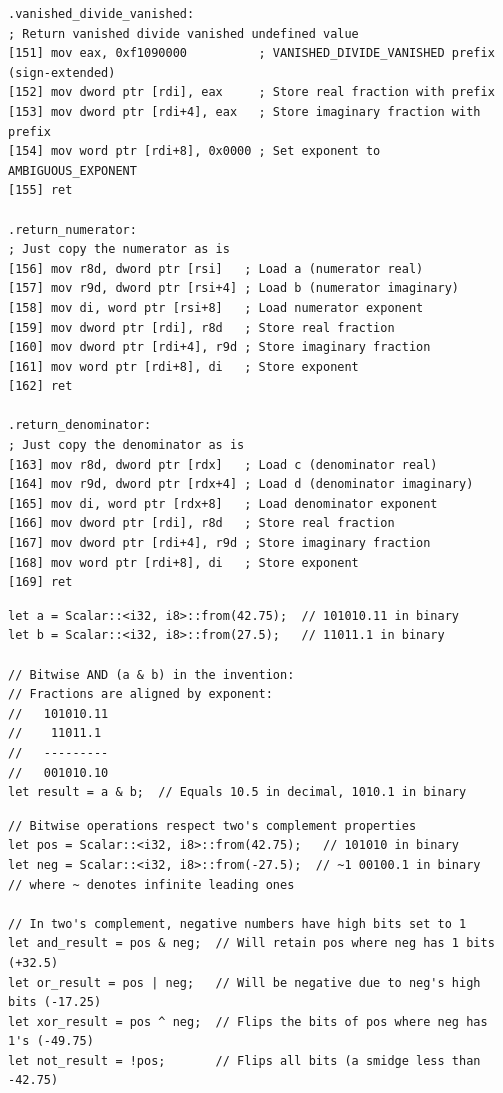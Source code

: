 \documentclass[12pt,letter]{article}
\begin{document}
\begin{lstlisting}[style=rust, caption={Complete Complex Division Assembly Implementation}, label={fig:circle_divide}]
.vanished_divide_vanished:
; Return vanished divide vanished undefined value
[151] mov eax, 0xf1090000          ; VANISHED_DIVIDE_VANISHED prefix (sign-extended)
[152] mov dword ptr [rdi], eax     ; Store real fraction with prefix
[153] mov dword ptr [rdi+4], eax   ; Store imaginary fraction with prefix
[154] mov word ptr [rdi+8], 0x0000 ; Set exponent to AMBIGUOUS_EXPONENT
[155] ret

.return_numerator:
; Just copy the numerator as is
[156] mov r8d, dword ptr [rsi]   ; Load a (numerator real)
[157] mov r9d, dword ptr [rsi+4] ; Load b (numerator imaginary)
[158] mov di, word ptr [rsi+8]   ; Load numerator exponent
[159] mov dword ptr [rdi], r8d   ; Store real fraction
[160] mov dword ptr [rdi+4], r9d ; Store imaginary fraction
[161] mov word ptr [rdi+8], di   ; Store exponent
[162] ret

.return_denominator:
; Just copy the denominator as is
[163] mov r8d, dword ptr [rdx]   ; Load c (denominator real)
[164] mov r9d, dword ptr [rdx+4] ; Load d (denominator imaginary)
[165] mov di, word ptr [rdx+8]   ; Load denominator exponent
[166] mov dword ptr [rdi], r8d   ; Store real fraction
[167] mov dword ptr [rdi+4], r9d ; Store imaginary fraction
[168] mov word ptr [rdi+8], di   ; Store exponent
[169] ret
\end{lstlisting}

\newpage
\begin{lstlisting}[style=rust, caption={Scalar Bitwise AND Example in Rust}, label={fig:scalar_bitwise_example}]
let a = Scalar::<i32, i8>::from(42.75);  // 101010.11 in binary
let b = Scalar::<i32, i8>::from(27.5);   // 11011.1 in binary

// Bitwise AND (a & b) in the invention:
// Fractions are aligned by exponent:
//   101010.11
//    11011.1
//   ---------
//   001010.10
let result = a & b;  // Equals 10.5 in decimal, 1010.1 in binary
\end{lstlisting}

\begin{lstlisting}[style=rust, caption={Scalar Bitwise Operations with Signs in Rust}, label={fig:scalar_bitwise_signs}]
// Bitwise operations respect two's complement properties
let pos = Scalar::<i32, i8>::from(42.75);   // 101010 in binary
let neg = Scalar::<i32, i8>::from(-27.5);  // ~1 00100.1 in binary
// where ~ denotes infinite leading ones

// In two's complement, negative numbers have high bits set to 1
let and_result = pos & neg;  // Will retain pos where neg has 1 bits (+32.5)
let or_result = pos | neg;   // Will be negative due to neg's high bits (-17.25)
let xor_result = pos ^ neg;  // Flips the bits of pos where neg has 1's (-49.75)
let not_result = !pos;       // Flips all bits (a smidge less than -42.75)
\end{lstlisting}
\end{document}
